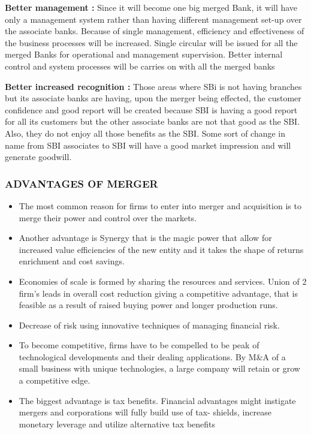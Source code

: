 \documentclass[a4paper, 12pt]{extarticle}
\begin{document}
{\par \textbf{Better management :} Since it will become one big merged Bank, it will have only a management system rather than having different management set-up over the associate banks. Because of single management, efficiency and effectiveness of the business processes will be increased. Single circular will be issued for all the merged Banks for operational and management supervision. Better internal control and system processes will be carries on with all the merged banks
\par \textbf{Better increased recognition :} Those areas where SBi is not having branches but its associate banks are having, upon the merger being effected, the customer confidence and good report will be created because SBI is having a good report for all its customers but the other associate banks are not that good as the SBI. Also, they do not enjoy all those benefits as the SBI. Some sort of change in name from SBI associates to SBI will have a good market impression and will generate goodwill.

\subsubsection{ADVANTAGES OF MERGER}
\begin{itemize}
\item The most common reason for firms to enter into merger and acquisition is to merge their power and control over the markets.
\item Another advantage is Synergy that is the magic power that allow for increased value efficiencies of the new entity and it takes the shape of returns enrichment and cost savings.
\item Economies of scale is formed by sharing the resources and services. Union of 2 firm's leads in overall cost reduction giving a competitive advantage, that is feasible as a result of raised buying power and longer production runs.
\item Decrease of risk using innovative techniques of managing financial risk.
\item To become competitive, firms have to be compelled to be peak of technological developments and their dealing applications. By M\&A of a small business with unique technologies, a large company will retain or grow a competitive edge.
\item The biggest advantage is tax benefits. Financial advantages might instigate mergers and corporations will fully build use of tax- shields, increase monetary leverage and utilize alternative tax benefits 
\end{itemize}

}
\end{document}

